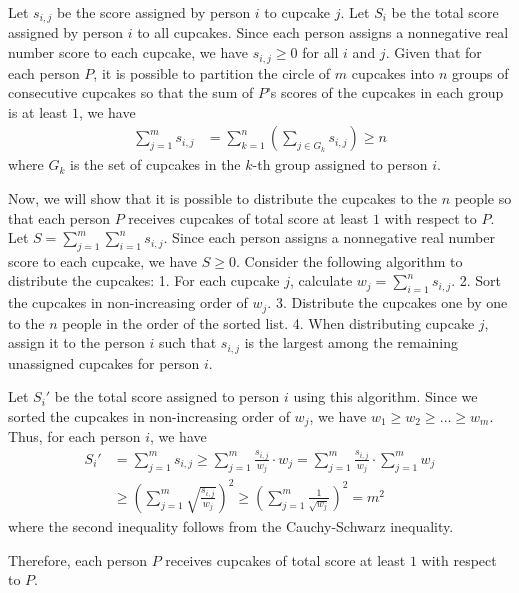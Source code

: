 Let $s_{i,j}$ be the score assigned by person $i$ to cupcake $j$.  
Let $S_i$ be the total score assigned by person $i$ to all cupcakes.  
Since each person assigns a nonnegative real number score to each cupcake, we have $s_{i,j} \geq 0$ for all $i$ and $j$.  
Given that for each person $P$, it is possible to partition the circle of $m$ cupcakes into $n$ groups of consecutive cupcakes so that the sum of $P$'s scores of the cupcakes in each group is at least $1$, we have
\begin{align*} \sum_{j=1}^{m} s_{i,j} &= \sum_{k=1}^{n} \left(\sum_{j \in G_k} s_{i,j}\right) \geq n \end{align*}
where $G_k$ is the set of cupcakes in the $k$-th group assigned to person $i$.

Now, we will show that it is possible to distribute the cupcakes to the $n$ people so that each person $P$ receives cupcakes of total score at least $1$ with respect to $P$.  
Let $S = \sum_{j=1}^{m} \sum_{i=1}^{n} s_{i,j}$.  
Since each person assigns a nonnegative real number score to each cupcake, we have $S \geq 0$.  
Consider the following algorithm to distribute the cupcakes:
1. For each cupcake $j$, calculate $w_j = \sum_{i=1}^{n} s_{i,j}$.
2. Sort the cupcakes in non-increasing order of $w_j$.
3. Distribute the cupcakes one by one to the $n$ people in the order of the sorted list.
4. When distributing cupcake $j$, assign it to the person $i$ such that $s_{i,j}$ is the largest among the remaining unassigned cupcakes for person $i$.

Let $S_i'$ be the total score assigned to person $i$ using this algorithm.  
Since we sorted the cupcakes in non-increasing order of $w_j$, we have $w_1 \geq w_2 \geq \ldots \geq w_m$.  
Thus, for each person $i$, we have
\begin{align*} S_i' &= \sum_{j=1}^{m} s_{i,j} \geq \sum_{j=1}^{m} \frac{s_{i,j}}{w_j} \cdot w_j = \sum_{j=1}^{m} \frac{s_{i,j}}{w_j} \cdot \sum_{j=1}^{m} w_j \\ &\geq \left(\sum_{j=1}^{m} \sqrt{\frac{s_{i,j}}{w_j}}\right)^2 \geq \left(\sum_{j=1}^{m} \frac{1}{\sqrt{w_j}}\right)^2 = m^2 \end{align*}
where the second inequality follows from the Cauchy-Schwarz inequality.

Therefore, each person $P$ receives cupcakes of total score at least $1$ with respect to $P$.
